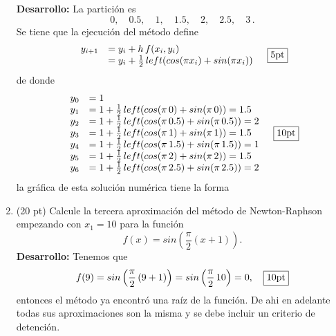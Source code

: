 \documentclass[11pt]{article}
\begin{document}
\begin{enumerate}
\textbf{Desarrollo:}
La partici\'on es 
$$
0, \quad 0.5, \quad 1, \quad 1.5, \quad 2, \quad 2.5, \quad 3\,.
$$
Se tiene que la ejecuci\'on del m\'etodo define
$$
\begin{array}{cl}
y_{i+1}	&=y_i+h\, f(x_i,y_i)\\
		&=y_i+\frac{1}{2}\, left(cos(\pi x_i)+sin(\pi x_i))
\end{array}\quad \fbox{5pt}
$$
de donde
$$
\begin{array}{cl}
y_0	&=1\\
y_1	&=1+\frac{1}{2}\, left(cos(\pi\, 0)+sin(\pi\, 0))=1.5\\
y_2	&=1+\frac{1}{2}\, left(cos(\pi\, 0.5)+sin(\pi\, 0.5))=2\\
y_3	&=1+\frac{1}{2}\, left(cos(\pi\, 1)+sin(\pi\, 1))=1.5\\
y_4	&=1+\frac{1}{2}\, left(cos(\pi\, 1.5)+sin(\pi\, 1.5))=1\\
y_5	&=1+\frac{1}{2}\, left(cos(\pi\, 2)+sin(\pi\, 2))=1.5\\
y_6	&=1+\frac{1}{2}\, left(cos(\pi\, 2.5)+sin(\pi\, 2.5))=2\\
\end{array} \quad \fbox{10pt}
$$
la gr\'afica de esta soluci\'on num\'erica tiene la forma
 \begin{center}
        \end{center}

\newpage
\item  (20 pt) Calcule la tercera aproximaci\'on del m\'etodo de Newton-Raphson empezando con  $x_1=10$ para la funci\'on
$$f(x)=sin\left(\frac{\pi}{2} (x+1)\right).$$
\textbf{Desarrollo:} Tenemos que 
$$
f(9)=sin\left(\frac{\pi}{2}\left(9+1\right)\right)=sin\left(\frac{\pi}{2}\, 10\right)=0
,\quad\fbox{10pt}
$$
entonces el m\'etodo ya encontr\'o una ra\'iz de la funci\'on. De ahi en adelante todas sus aproximaciones son la misma y se debe incluir un criterio de detenci\'on. \fbox{10pt}


\end{enumerate}
\end{document}
